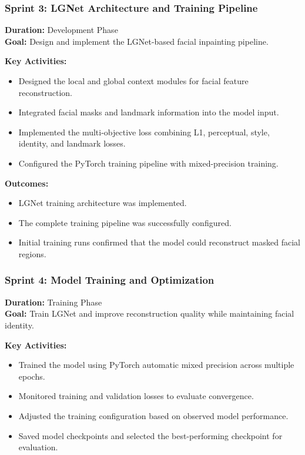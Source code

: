 \subsubsection{Sprint 3: LGNet Architecture and Training Pipeline}
\textbf{Duration:} Development Phase\\
\textbf{Goal:} Design and implement the LGNet-based facial inpainting pipeline.

\textbf{Key Activities:}
\begin{itemize}
    \item Designed the local and global context modules for facial feature reconstruction.
    \item Integrated facial masks and landmark information into the model input.
    \item Implemented the multi-objective loss combining L1, perceptual, style, identity, and landmark losses.
    \item Configured the PyTorch training pipeline with mixed-precision training.
\end{itemize}

\textbf{Outcomes:}
\begin{itemize}
    \item LGNet training architecture was implemented.
    \item The complete training pipeline was successfully configured.
    \item Initial training runs confirmed that the model could reconstruct masked facial regions.
\end{itemize}


\subsubsection{Sprint 4: Model Training and Optimization}
\textbf{Duration:} Training Phase\\
\textbf{Goal:} Train LGNet and improve reconstruction quality while maintaining facial identity.

\textbf{Key Activities:}
\begin{itemize}
    \item Trained the model using PyTorch automatic mixed precision across multiple epochs.
    \item Monitored training and validation losses to evaluate convergence.
    \item Adjusted the training configuration based on observed model performance.
    \item Saved model checkpoints and selected the best-performing checkpoint for evaluation.
\end{itemize}

